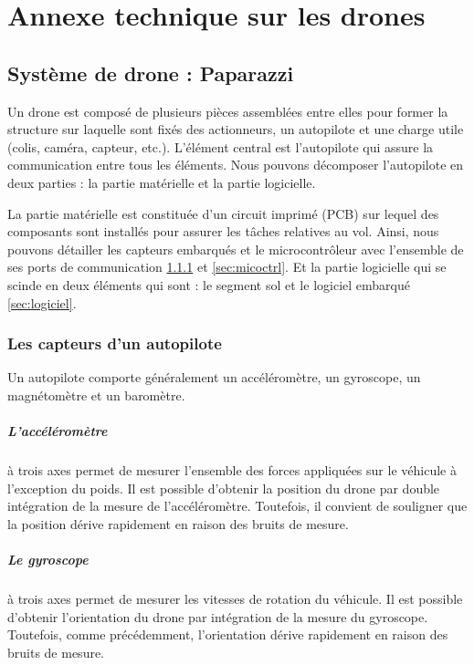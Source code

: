 \chapter{Annexe technique sur les drones}
\label{chap:annexe1}

\section{Système de drone : Paparazzi}

Un drone est composé de plusieurs pièces assemblées entre elles pour former la structure sur laquelle sont fixés des actionneurs, un autopilote et une charge utile (colis, caméra, capteur, etc.). L'élément central est l'autopilote qui assure la communication entre tous les éléments. Nous pouvons décomposer l'autopilote en deux parties : la partie matérielle et la partie logicielle.

La partie matérielle est constituée d'un circuit imprimé (PCB) sur lequel des composants sont installés pour assurer les tâches relatives au vol. Ainsi, nous pouvons détailler les capteurs embarqués et le microcontrôleur avec l'ensemble de ses ports de communication \ref{sec:capteurs} et \ref{sec:micoctrl}. Et la partie logicielle qui se scinde en deux éléments qui sont : le segment sol et le logiciel embarqué \ref{sec:logiciel}.

 \subsection{Les capteurs d'un autopilote}
 \label{sec:capteurs}
 Un autopilote comporte généralement un accéléromètre, un gyroscope, un magnétomètre et un baromètre.
 
 \paragraph{L'accéléromètre}à trois axes permet de mesurer l'ensemble des forces appliquées sur le véhicule à l'exception du poids. Il est possible d'obtenir la position du drone par double intégration de la mesure de l'accéléromètre. Toutefois, il convient de souligner que la position dérive rapidement en raison des bruits de mesure.

 \paragraph{Le gyroscope}à trois axes permet de mesurer les vitesses de rotation du véhicule. Il est possible d'obtenir l'orientation du drone par intégration de la mesure du gyroscope. Toutefois, comme précédemment, l'orientation dérive rapidement en raison des bruits de mesure.

